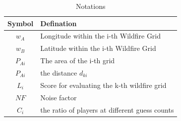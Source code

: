 \documentclass[12pt]{ctexart}
\begin{document}
\begin{table}[htbp]%
	\renewcommand{\arraystretch}{1.1}
	\begin{center}
		\caption{Notations}
		\centering
		\begin{tabular}{cl}
			\toprule[1.5pt]
			\multicolumn{1}{m{4cm}}{\centering \textbf{Symbol}}
			                      & \multicolumn{1}{m{10cm}}{\centering \textbf{Defination} }                       \\
			\midrule
			$w_A$                 & Longitude within the i-th Wildfire Grid                                \\
			$w_B$                 & Latitude within the i-th Wildfire Grid                                 \\
			$P_{Ai}$              & The area of the i-th grid                                              \\
			$P_{Ai}$              & the distance $d_{ki}$                                                  \\
			$L_i$                 & Score for evaluating the k-th wildfire grid                            \\
			$NF$                  & Noise factor                                                           \\
			$C_i$                 & the ratio of players at different guess counts                         \\
			\bottomrule[1.5pt]
		\end{tabular}
		\label{tb:notation}
	\end{center}
\end{table}
\vspace{-1cm}
\end{document}
